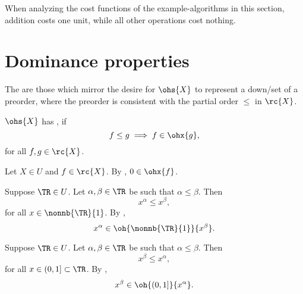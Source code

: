 \documentclass[b5paper, english, oneside]{memoir}
\begin{document}
\begin{note}
\label{ModelForExamples}
When analyzing the cost functions of the example-algorithms in this section, addition costs one unit, while all other operations cost nothing.
\end{note}

\section{Dominance properties}

The  are those which mirror the desire for $\ohs{X}$ to represent a down\-/set of a preorder, where the preorder is consistent with the partial order $\leq$ in $\rc{X}$. 

\begin{definition}
$\ohs{X}$ has , if 
\begin{equation}
f \leq g \implies f \in \ohx{g},
\end{equation} 
for all $f, g \in \rc{X}$. 
\end{definition}

\begin{example}
Let $X \in U$ and $f \in \rc{X}$. By , $0 \in \ohx{f}$.
\end{example}

\begin{example}
Suppose $\TR \in U$. Let $\alpha, \beta \in \TR$ be such that $\alpha \leq \beta$. Then 
\begin{equation}
x^{\alpha} \leq x^{\beta},
\end{equation}
for all $x \in \nonnb{\TR}{1}$. By ,
\begin{equation}
x^{\alpha} \in \oh{\nonnb{\TR}{1}}{x^{\beta}}.
\end{equation}
\end{example}

\begin{example}
Suppose $\TR \in U$. Let $\alpha, \beta \in \TR$ be such that $\alpha \leq \beta$. Then 
\begin{equation}
x^{\beta} \leq x^{\alpha},
\end{equation}
for all $x \in (0, 1] \subset \TR$. By ,
\begin{equation}
x^{\beta} \in \oh{(0, 1]}{x^{\alpha}}.
\end{equation}
\end{example}
\end{document}
